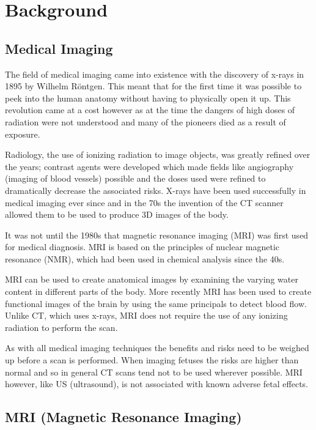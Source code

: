 \chapter{Background}\section{Medical Imaging}
The field of medical imaging came into existence with the discovery of x-rays in 1895 by Wilhelm R\"{o}ntgen\cite{rontgen}. This meant that for the first time it was possible to peek into the human anatomy without having to physically open it up. This revolution came at a cost however as at the time the dangers of high doses of radiation were not understood and many of the pioneers died as a result of exposure\cite{xraydeath}.

Radiology, the use of ionizing radiation to image objects, was greatly refined over the years; contrast agents were developed which made fields like angiography (imaging of blood vessels) possible\cite{infinityhistory} and the doses used were refined to dramatically decrease the associated risks. X-rays have been used successfully in medical imaging ever since and in the 70s the invention of the CT scanner allowed them to be used to produce 3D images of the body.

It was not until the 1980s that magnetic resonance imaging (MRI) was first used for medical diagnosis. MRI is based on the principles of nuclear magnetic resonance (NMR), which had been used in chemical analysis since the 40s\cite{bshr:mallard}.

MRI can be used to create anatomical images by examining the varying water content in different parts of the body. More recently MRI has been used to create functional images of the brain by using the same principals to detect blood flow\cite{fmri}. Unlike CT, which uses x-rays, MRI does not require the use of any ionizing radiation to perform the scan.

As with all medical imaging techniques the benefits and risks need to be weighed up before a scan is performed. When imaging fetuses the risks are higher than normal and so in general CT scans tend not to be used wherever possible. MRI however, like US (ultrasound), is not associated with known adverse fetal effects.\cite{pregnancyimagingguidelines}

\newpage
\section{MRI (Magnetic Resonance Imaging)}\cite{howmriworks}

